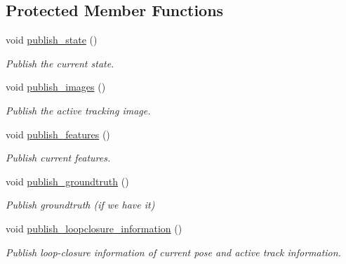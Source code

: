 \subsection*{Protected Member Functions}
\begin{DoxyCompactItemize}
\item 
\mbox{\label{classov__msckf_1_1ROS2Visualizer_aea6f0c1073edfe9b47dcaf1ef341d4be}} 
void \hyperlink{classov__msckf_1_1ROS2Visualizer_aea6f0c1073edfe9b47dcaf1ef341d4be}{publish\+\_\+state} ()
\begin{DoxyCompactList}\small\item\em Publish the current state. \end{DoxyCompactList}\item 
\mbox{\label{classov__msckf_1_1ROS2Visualizer_a1fac4c51134464475f3a40b15ab252af}} 
void \hyperlink{classov__msckf_1_1ROS2Visualizer_a1fac4c51134464475f3a40b15ab252af}{publish\+\_\+images} ()
\begin{DoxyCompactList}\small\item\em Publish the active tracking image. \end{DoxyCompactList}\item 
\mbox{\label{classov__msckf_1_1ROS2Visualizer_ab88802145290ae7b52b3d544b70db3a9}} 
void \hyperlink{classov__msckf_1_1ROS2Visualizer_ab88802145290ae7b52b3d544b70db3a9}{publish\+\_\+features} ()
\begin{DoxyCompactList}\small\item\em Publish current features. \end{DoxyCompactList}\item 
\mbox{\label{classov__msckf_1_1ROS2Visualizer_a160bf85485c49a5f80462ad717e12837}} 
void \hyperlink{classov__msckf_1_1ROS2Visualizer_a160bf85485c49a5f80462ad717e12837}{publish\+\_\+groundtruth} ()
\begin{DoxyCompactList}\small\item\em Publish groundtruth (if we have it) \end{DoxyCompactList}\item 
\mbox{\label{classov__msckf_1_1ROS2Visualizer_a81f6ad6d7e9e03f950ce58ad2c065844}} 
void \hyperlink{classov__msckf_1_1ROS2Visualizer_a81f6ad6d7e9e03f950ce58ad2c065844}{publish\+\_\+loopclosure\+\_\+information} ()
\begin{DoxyCompactList}\small\item\em Publish loop-\/closure information of current pose and active track information. \end{DoxyCompactList}\end{DoxyCompactItemize}
